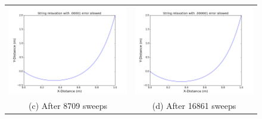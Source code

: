 \documentclass[11pt]{article}
\begin{document}
\begin{figure}[H]
\begin{tabular}{cc}
\includegraphics[scale=.3]{1_relaxation(00001).png} & \includegraphics[scale=.3]{1_relaxation(000001).png}\\
(c) After 8709 sweeps & (d) After 16861 sweeps \\[6pt]


\end{tabular}
\end{figure}
\end{document}
